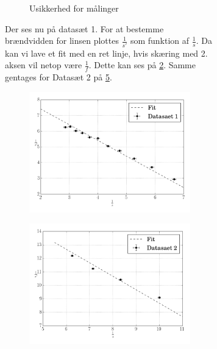 \begin{table}[H]
\begin{figure}[H]
\begin{figure}[H]
\begin{figure}[H]
    \caption{Usikkerhed for målinger}
    \label{fig:usikkerhed}
\end{figure}
Der ses nu på datasæt 1. For at bestemme brændvidden for linsen plottes $\frac{1}{s'}$ som funktion af $\frac{1}{s}$. Da kan vi lave et fit med en ret linje, hvis skæring med 2. aksen vil netop være  $\frac{1}{f}$. Dette kan ses på \cref{fig:1}. Samme gentages for Datasæt 2 på \cref{fig:2}.
\begin{figure}[H]
    \includegraphics[width=\linewidth]{1.png}
    \caption{}
    \label{fig:1}
\end{figure}
\begin{figure}[H]
    \includegraphics[width=\linewidth]{2.png}
    \caption{}
    \label{fig:2}
\end{figure}


\end{figure}
\end{figure}
\end{table}
